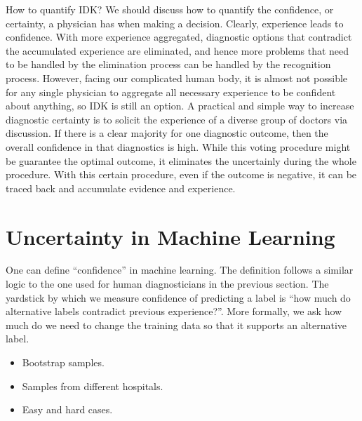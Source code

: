 \documentclass[9pt,twocolumn,twoside]{pnas-new}
\begin{document}
How to quantify IDK? We should discuss how to quantify the confidence, or certainty, a physician has when making a decision. Clearly, experience leads to confidence. With more experience aggregated, diagnostic options that contradict the accumulated
  experience are eliminated, and hence more problems that need to be handled by the elimination process can be handled by the recognition process. However, facing our complicated human body, it is almost not possible for any single physician to aggregate all necessary experience to be confident about anything, so IDK is still an option. A practical and simple way to increase diagnostic certainty is to solicit the experience of a diverse group of doctors via discussion. If there is a clear majority for one diagnostic outcome,
      then the overall confidence in that diagnostics is high. While this voting procedure might be guarantee the optimal outcome, it eliminates the uncertainly during the whole procedure. With this certain procedure, even if the outcome is negative, it can be traced back and accumulate evidence and experience. 
%


    
\section*{Uncertainty in Machine Learning}

One can define ``confidence'' in machine learning. The definition follows a
similar logic to the one used for human diagnosticians in the previous
section. The yardstick by which we measure confidence of predicting a
label is ``how much do alternative labels contradict previous
experience?''.
More formally, we ask how much do we need to change the training data
so that it supports an alternative label.




\begin{itemize}
  \item Bootstrap samples.
  \item Samples from different hospitals.
  \item Easy and hard cases.
  \end{itemize}
\end{document}
